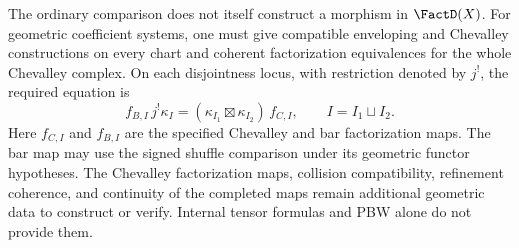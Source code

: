 The ordinary comparison does not itself construct a morphism in $\FactD(X)$.
For geometric coefficient systems, one must give compatible enveloping and Chevalley constructions on every chart
and coherent factorization equivalences for the whole Chevalley complex.
On each disjointness locus, with restriction denoted by $j^!$, the required equation is
\[
 f_{B,I}\,j^!\kappa_I
 =(\kappa_{I_1}\boxtimes\kappa_{I_2})\,f_{C,I},
 \qquad I=I_1\sqcup I_2.
\]
Here $f_{C,I}$ and $f_{B,I}$ are the specified Chevalley and bar factorization maps.
The bar map may use the signed shuffle comparison under its geometric functor hypotheses.
The Chevalley factorization maps, collision compatibility, refinement coherence,
and continuity of the completed maps remain additional geometric data to construct or verify.
Internal tensor formulas and PBW alone do not provide them.


